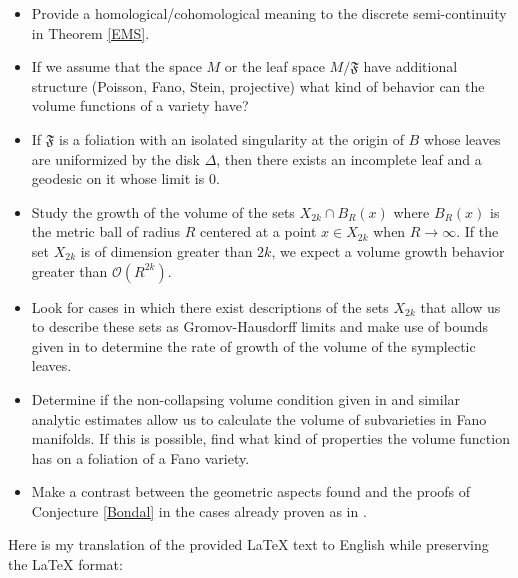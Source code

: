 \documentclass[12pt,twoside,a4paper]{report}
\begin{document}
\begin{itemize}
        \item Provide a homological/cohomological meaning to the discrete semi-continuity in Theorem \ref{EMS}.

        \item If we assume that the space $M$ or the leaf space $M/\mathfrak{F}$ have additional structure (Poisson, Fano, Stein, projective)
        what kind of behavior can the volume functions of a variety have?

        \item If $\mathfrak{F}$ is a foliation with an isolated singularity at the origin of $B$ whose leaves are uniformized by the disk $\Delta$,
        then there exists an incomplete leaf and a geodesic on it whose limit is $0$.

        \item Study the growth of the volume of the sets $X_{2k}\cap B_{R}(x)$ where $B_R(x)$ is the metric ball
        of radius $R$ centered at a point $x\in X_{2k}$ when $R\rightarrow\infty$. If the set $X_{2k}$ is
        of dimension greater than $2k$, we expect a volume growth behavior greater than $\mathcal{O}(R^{2k}).$

        \item Look for cases in which there exist descriptions of the sets $X_{2k}$ that allow us to describe these sets
        as Gromov-Hausdorff limits and make use of bounds given in \cite{D-SS} to determine the rate of growth
        of the volume of the symplectic leaves.

        \item Determine if the non-collapsing volume condition given in \cite{D-SS} and similar analytic estimates
        allow us to calculate the volume of subvarieties in Fano manifolds. If this is possible, find
        what kind of properties the volume function has on a foliation of a Fano variety.

        \item Make a contrast between the geometric aspects found and the proofs of Conjecture \ref{Bondal} in the
        cases already proven as in \cite{Gua-Pym}.

\end{itemize}






Here is my translation of the provided LaTeX text to English while preserving the LaTeX format:
\end{document}
